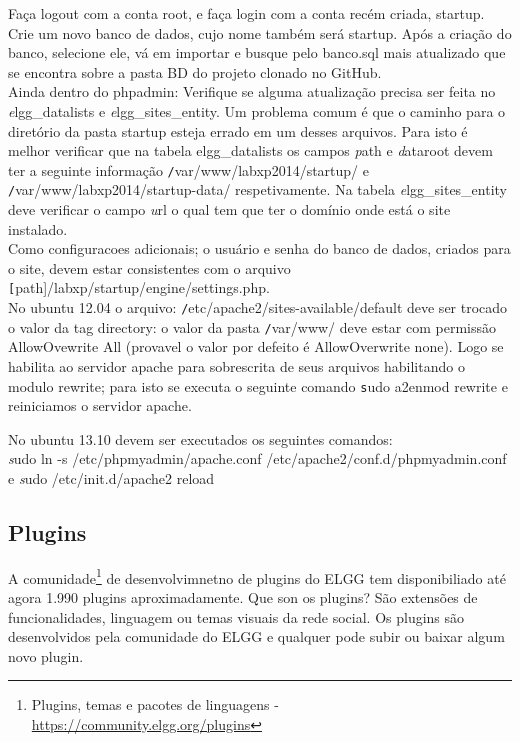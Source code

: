 \documentclass[12pt, letterpaper, onecolumn]{article}
\begin{document}
Faça logout com a conta root, e faça login com a conta recém criada, startup. Crie um novo banco de dados, cujo nome também será startup. Após a criação do banco, selecione ele, vá em importar e busque pelo banco.sql mais atualizado que se encontra sobre a pasta BD do projeto clonado no GitHub.\\

Ainda dentro do phpadmin: Verifique se alguma atualização precisa ser feita no {\textit elgg\_datalists} e {\textit elgg\_sites\_entity}. Um problema comum é que o caminho para o diretório da pasta startup esteja errado em um desses arquivos. Para isto é melhor verificar que na tabela elgg\_datalists os campos {\textit path} e {\textit dataroot} devem ter a seguinte informação {\texttt /var/www/labxp2014/startup/} e {\texttt /var/www/labxp2014/startup-data/} respetivamente. Na tabela {\textit elgg\_sites\_entity} deve verificar o campo  {\textit url } o qual tem que ter o domínio onde está o site instalado.\\

Como configuracoes adicionais; o usuário e senha do banco de dados, criados para o site, devem estar consistentes com o arquivo {\texttt [path]/labxp/startup/engine/settings.php}.\\

No ubuntu 12.04 o arquivo: {\texttt /etc/apache2/sites-available/default} deve ser trocado o valor da tag directory: o valor da pasta {\texttt /var/www/} deve estar  com permissão AllowOvewrite All (provavel o valor por defeito é AllowOverwrite none). Logo se habilita ao servidor apache para sobrescrita de seus arquivos habilitando o modulo rewrite; para isto se executa o seguinte comando {\texttt sudo a2enmod rewrite} e reiniciamos o servidor apache.

No ubuntu 13.10 devem ser executados os seguintes comandos:\\
{\textit sudo ln -s /etc/phpmyadmin/apache.conf /etc/apache2/conf.d/phpmyadmin.conf } e {\textit sudo /etc/init.d/apache2 reload}

\subsection{Plugins}
A comunidade\footnote{ Plugins, temas e pacotes de linguagens -  \url{https://community.elgg.org/plugins}} de desenvolvimnetno de plugins do ELGG tem disponibiliado até agora 1.990 plugins aproximadamente. Que son os plugins? São extensões de funcionalidades, linguagem ou temas visuais da rede social. Os plugins são desenvolvidos pela comunidade do ELGG e qualquer pode subir ou baixar algum novo plugin.
\end{document}
